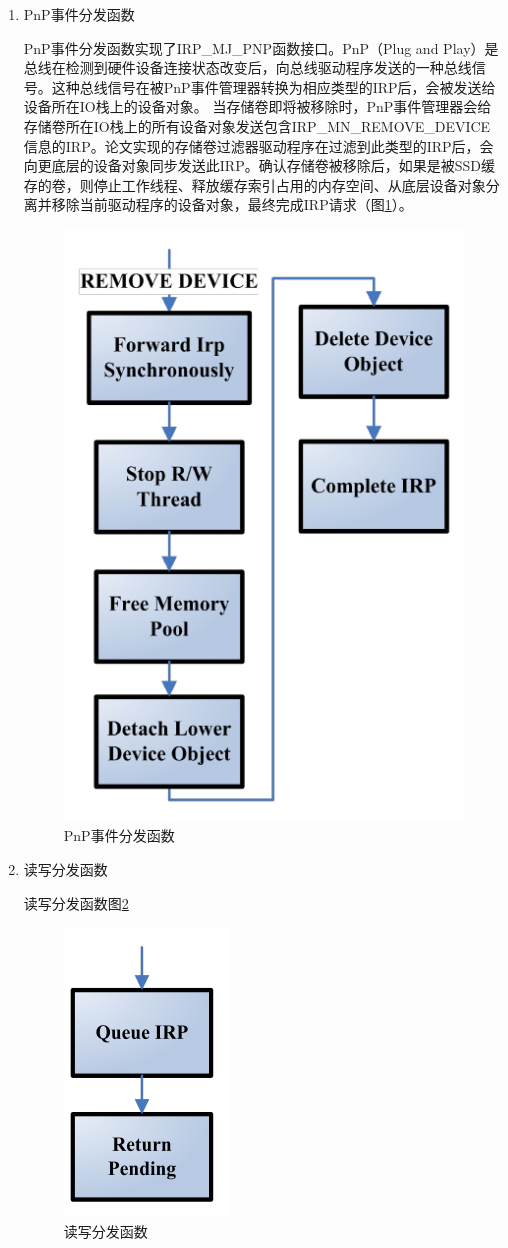 \begin{enumerate}
\item PnP事件分发函数

PnP事件分发函数实现了IRP\_MJ\_PNP函数接口。PnP（Plug and Play）是总线在检测到硬件设备连接状态改变后，向总线驱动程序发送的一种总线信号。这种总线信号在被PnP事件管理器转换为相应类型的IRP后，会被发送给设备所在IO栈上的设备对象。
当存储卷即将被移除时，PnP事件管理器会给存储卷所在IO栈上的所有设备对象发送包含IRP\_MN\_REMOVE\_DEVICE信息的IRP。论文实现的存储卷过滤器驱动程序在过滤到此类型的IRP后，会向更底层的设备对象同步发送此IRP。确认存储卷被移除后，如果是被SSD缓存的卷，则停止工作线程、释放缓存索引占用的内存空间、从底层设备对象分离并移除当前驱动程序的设备对象，最终完成IRP请求（图\ref{fig:df-pnp}）。

\begin{figure}[h]
\centering
\includegraphics[width=0.4\linewidth]{./graph/df-pnp}
\caption{PnP事件分发函数}
\label{fig:df-pnp}
\end{figure}

\item 读写分发函数

读写分发函数图\ref{fig:df-rw}

\begin{figure}[h]
\centering
\includegraphics[width=0.2\linewidth]{./graph/df-rw}
\caption{读写分发函数}
\label{fig:df-rw}
\end{figure}

\end{enumerate}

